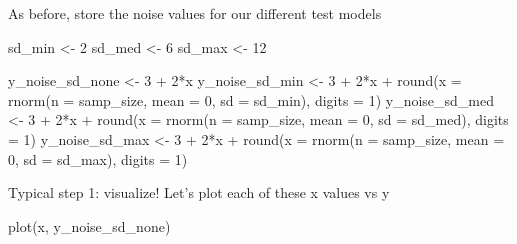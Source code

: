 \documentclass[
]{book}
\newenvironment{Shaded}{\begin{snugshade}}{\end{snugshade}}
\newcommand{\AttributeTok}[1]{\textcolor[rgb]{0.77,0.63,0.00}{#1}}
\newcommand{\DecValTok}[1]{\textcolor[rgb]{0.00,0.00,0.81}{#1}}
\newcommand{\FunctionTok}[1]{\textcolor[rgb]{0.00,0.00,0.00}{#1}}
\newcommand{\NormalTok}[1]{#1}
\newcommand{\OtherTok}[1]{\textcolor[rgb]{0.56,0.35,0.01}{#1}}
\newcommand{\SpecialCharTok}[1]{\textcolor[rgb]{0.00,0.00,0.00}{#1}}
\begin{document}
As before, store the noise values for our different test models

\begin{Shaded}
\begin{Highlighting}[]
\NormalTok{sd\_min }\OtherTok{\textless{}{-}} \DecValTok{2}
\NormalTok{sd\_med }\OtherTok{\textless{}{-}} \DecValTok{6}
\NormalTok{sd\_max }\OtherTok{\textless{}{-}} \DecValTok{12}

\NormalTok{y\_noise\_sd\_none }\OtherTok{\textless{}{-}} \DecValTok{3} \SpecialCharTok{+} \DecValTok{2}\SpecialCharTok{*}\NormalTok{x}
\NormalTok{y\_noise\_sd\_min }\OtherTok{\textless{}{-}} \DecValTok{3} \SpecialCharTok{+} \DecValTok{2}\SpecialCharTok{*}\NormalTok{x }\SpecialCharTok{+} \FunctionTok{round}\NormalTok{(}\AttributeTok{x =} \FunctionTok{rnorm}\NormalTok{(}\AttributeTok{n =}\NormalTok{ samp\_size, }\AttributeTok{mean =} \DecValTok{0}\NormalTok{, }\AttributeTok{sd =}\NormalTok{ sd\_min), }\AttributeTok{digits =} \DecValTok{1}\NormalTok{)}
\NormalTok{y\_noise\_sd\_med }\OtherTok{\textless{}{-}} \DecValTok{3} \SpecialCharTok{+} \DecValTok{2}\SpecialCharTok{*}\NormalTok{x }\SpecialCharTok{+} \FunctionTok{round}\NormalTok{(}\AttributeTok{x =} \FunctionTok{rnorm}\NormalTok{(}\AttributeTok{n =}\NormalTok{ samp\_size, }\AttributeTok{mean =} \DecValTok{0}\NormalTok{, }\AttributeTok{sd =}\NormalTok{ sd\_med), }\AttributeTok{digits =} \DecValTok{1}\NormalTok{)}
\NormalTok{y\_noise\_sd\_max }\OtherTok{\textless{}{-}} \DecValTok{3} \SpecialCharTok{+} \DecValTok{2}\SpecialCharTok{*}\NormalTok{x }\SpecialCharTok{+} \FunctionTok{round}\NormalTok{(}\AttributeTok{x =} \FunctionTok{rnorm}\NormalTok{(}\AttributeTok{n =}\NormalTok{ samp\_size, }\AttributeTok{mean =} \DecValTok{0}\NormalTok{, }\AttributeTok{sd =}\NormalTok{ sd\_max), }\AttributeTok{digits =} \DecValTok{1}\NormalTok{)}
\end{Highlighting}
\end{Shaded}

Typical step 1: visualize! Let's plot each of these x values vs y

\begin{Shaded}
\begin{Highlighting}[]
\FunctionTok{plot}\NormalTok{(x, y\_noise\_sd\_none)}
\end{Highlighting}
\end{Shaded}
\end{document}

